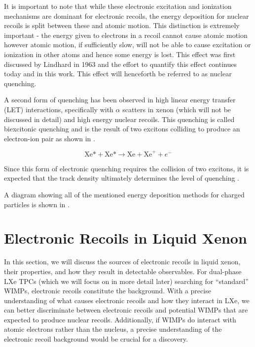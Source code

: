 It is important to note that while these electronic excitation and ionization mechanisms are dominant for electronic recoils, the energy deposition for nuclear recoils is split between these and atomic motion.  This distinction is extremely important - the energy given to electrons in a recoil cannot cause atomic motion however atomic motion, if sufficiently slow, will not be able to cause excitation or ionization in other atoms and hence some energy is lost.  This effect was first discussed by Lindhard in 1963 \cite{lindhard1963integral} and the effort to quantify this effect continues today and in this work.  This effect will henceforth be referred to as nuclear quenching.

A second form of quenching has been observed in high linear energy transfer (LET) interactions, specifically with $\alpha$ scatters in xenon (which will not be discussed in detail) and high energy nuclear recoils.  This quenching is called biexcitonic quenching and is the result of two excitons colliding to produce an electron-ion pair as shown in .

\begin{equation}
        \label{eqn:biexcitonic_quenching} 
        \textrm{Xe*} + \textrm{Xe*} \rightarrow \textrm{Xe} + \textrm{Xe}^+ + e^-
\end{equation}

Since this form of electronic quenching requires the collision of two excitons, it is expected that the track density ultimately determines the level of quenching \cite{hitachi2005properties}.

A diagram showing all of the mentioned energy deposition methods for charged particles is shown in .



\section{Electronic Recoils in Liquid Xenon}
\label{sec:lxe_er}

In this section, we will discuss the sources of electronic recoils in liquid xenon, their properties, and how they result in detectable observables.  For dual-phase LXe TPCs (which we will focus on in more detail later) searching for ``standard'' WIMPs, electronic recoils constitute the background.  With a precise understanding of what causes electronic recoils and how they interact in LXe, we can better discriminate between electronic recoils and potential WIMPs that are expected to produce nuclear recoils.  Additionally, if WIMPs do interact with atomic electrons rather than the nucleus, a precise understanding of the electronic recoil background would be crucial for a discovery.  

